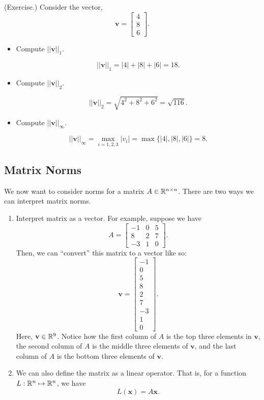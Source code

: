 \documentclass[letterpaper]{article}
\newcommand{\0}{\mathbf{0}}
\newcommand{\x}{\mathbf{x}}
\newcommand{\vv}{\mathbf{v}}
\begin{document}
\begin{mdframed}
    (Exercise.) Consider the vector, \[\vv = \begin{bmatrix}
        4 \\ 8 \\ 6
    \end{bmatrix}.\]

    \begin{itemize}
        \item Compute $||\vv||_1$.
        \begin{mdframed}
            \[||\vv||_1 = |4| + |8| + |6| = 18.\]
        \end{mdframed}

        \item Compute $||\vv||_2$.
        \begin{mdframed}
            \[||\vv||_2 = \sqrt{4^2 + 8^2 + 6^2} = \sqrt{116}.\]
        \end{mdframed}

        \item Compute $||\vv||_\infty$. 
        \begin{mdframed}
            \[||\vv||_\infty = \max_{i = 1, 2, 3} |v_i| = \max\{|4|, |8|, |6|\} = 8.\]
        \end{mdframed}
    \end{itemize}
\end{mdframed}

\subsection{Matrix Norms}
We now want to consider norms for a matrix $A \in \mathbb{R}^{n \times n}$. There are two ways we can interpret matrix norms.
\begin{enumerate}
    \item Interpret matrix as a vector. For example, suppose we have \[A = \begin{bmatrix}
        -1 & 0 & 5 \\ 8 & 2 & 7 \\ -3 & 1 & 0
    \end{bmatrix}.\] Then, we can ``convert'' this matrix to a vector like so: \[\vv = \begin{bmatrix}
        -1 \\ 0 \\ 5 \\ 8 \\ 2 \\ 7 \\ -3 \\ 1 \\ 0
    \end{bmatrix}.\] Here, $\vv \in \R^9$. Notice how the first column of $A$ is the top three elements in $\vv$, the second column of $A$ is the middle three elements of $\vv$, and the last column of $A$ is the bottom three elements of $\vv$. 

    \item We can also define the matrix as a linear operator. That is, for a function $L: \mathbb{R}^n \mapsto \mathbb{R}^n$, we have \[L(\x) = A\x.\]
\end{enumerate}
\end{document}
